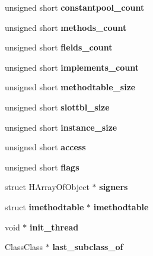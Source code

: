 \begin{DoxyCompactItemize}
\begin{tabbing}
\end{tabbing}\item 
unsigned short {\bfseries constantpool\_\-count}\label{struct_classjava__lang___class_a0e552953cb9eea7d5c4a2bf58f8db5ea}

\item 
unsigned short {\bfseries methods\_\-count}\label{struct_classjava__lang___class_a7162ae0b13c126cef1bb66b896bf1d38}

\item 
unsigned short {\bfseries fields\_\-count}\label{struct_classjava__lang___class_a89e91be550f2767ee071e275b44df079}

\item 
unsigned short {\bfseries implements\_\-count}\label{struct_classjava__lang___class_a0659661fddd0f0d81f3e663d37fd3b6e}

\item 
unsigned short {\bfseries methodtable\_\-size}\label{struct_classjava__lang___class_abd299f500fe87d801a569d7bf475adb0}

\item 
unsigned short {\bfseries slottbl\_\-size}\label{struct_classjava__lang___class_ad45727b49be0040890f34ec2a42985e2}

\item 
unsigned short {\bfseries instance\_\-size}\label{struct_classjava__lang___class_aaf3df278e60c727d88cf115fa35d2814}

\item 
unsigned short {\bfseries access}\label{struct_classjava__lang___class_ad2510e15717f36f11c8221f137d67492}

\item 
unsigned short {\bfseries flags}\label{struct_classjava__lang___class_a511f40b9359313d224555f99a29f1f17}

\item 
struct HArrayOfObject $\ast$ {\bfseries signers}\label{struct_classjava__lang___class_a56eaf624fef200ee9f0a7997b96b93d3}

\item 
struct {\bf imethodtable} $\ast$ {\bfseries imethodtable}\label{struct_classjava__lang___class_a52378bb610ec964384ee7726b85c2ea5}

\item 
void $\ast$ {\bfseries init\_\-thread}\label{struct_classjava__lang___class_ae0fd4a469e8b13772c2a2c1cc2ec3eac}

\item 
ClassClass $\ast$ {\bfseries last\_\-subclass\_\-of}\label{struct_classjava__lang___class_add9ed2bcb215e12bd62f594d846af7da}


\end{DoxyCompactItemize}
